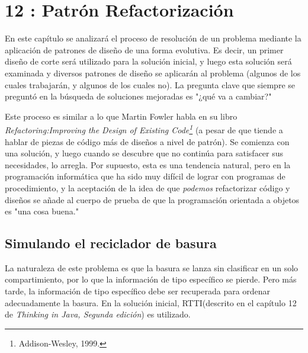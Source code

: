 
\section*{12 : Patrón Refactorización}
\label{sec:pr}


En este capítulo se analizará el proceso de resolución de un problema mediante la aplicación de patrones de diseño de una forma evolutiva. Es decir, un primer diseño de corte será utilizado para la solución inicial, y luego esta solución será examinada y diversos patrones de diseño se aplicarán al problema (algunos de los cuales trabajarán, y algunos de los cuales no). La pregunta clave que siempre se preguntó en la búsqueda de soluciones mejoradas es "¿qué va a cambiar?"     \newline

Este proceso es similar a lo que Martin Fowler habla en su libro \textit{Refactoring:Improving the Design of Existing Code\footnote{Addison-Wesley, 1999.}} (a pesar de que tiende a hablar de piezas de código más de diseños a nivel de patrón). Se comienza con una solución, y luego cuando se descubre que no continúa para satisfacer sus necesidades, lo arregla. Por supuesto, esta es una tendencia natural, pero en la programación informática que ha sido muy difícil de lograr con programas de procedimiento, y la aceptación de la idea de que \textit{podemos} refactorizar código y diseños se añade al cuerpo de prueba de que la programación orientada a objetos es "una cosa buena."   \newline



\subsection*{Simulando el reciclador de basura}
\label{subsec:serdb}

La naturaleza de este problema es que la basura se lanza sin clasificar en un solo compartimiento, por lo que la información de tipo específico se pierde. Pero más tarde, la información de tipo específico debe ser recuperada para ordenar adecuadamente la basura. En la solución inicial, RTTI(descrito en el capítulo 12 de \textit{Thinking in Java, Segunda edición}) es utilizado.    \newline

